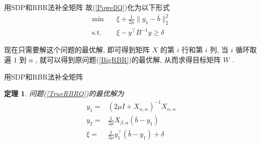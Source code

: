 \documentclass[slidestop, compress, mathserif, UTF8]{beamer}
\newtheorem{theo}{\bf \textcolor[rgb]{0.8,0,0}{定理}}[section]          %
\numberwithin{equation}{section}                                        %
\begin{document}
            \begin{frame}[t]{用SDP和RBR法补全矩阵}
                故(\ref{PowellQ})化为以下形式
				\begin{equation}
					\begin{split}\label{TrueRBRQ}
						\min \quad
							& \xi + \frac{1}{2\mu} \lVert{y_1 - \bar{b}}\rVert^2_2\\
						\text{s.t.} \quad
							& \xi - y^\top B^{-1} y \geq \delta
					\end{split}
				\end{equation}

                现在只需要解这个问题的最优解, 即可得到矩阵 $X$ 的第 $i$ 行和第 $i$ 列, 当 $i$ 循环取遍 $1$ 到 $n$ , 就可以得到原问题(\ref{BigRBR})的最优解, 从而求得目标矩阵 $W$ .
            \end{frame}
            \begin{frame}[t]{用SDP和RBR法补全矩阵}
                \begin{theo}
                    问题(\ref{TrueRBRQ})的最优解为
                    \begin{equation}
                        \begin{split}\label{TrueRBRA}
                            y_1 = & (2 \mu I + X_{\alpha, \alpha})^{-1} X_{\alpha, \alpha}\\
                            y_2 = & \frac{1}{2 \mu} X_{\beta, \alpha} (\bar{b} - y_1)\\
                            \xi = & \frac{1}{2 \mu} y_1^\top (\bar{b} - y_1) + \delta
                        \end{split}
                    \end{equation}
                \end{theo}
            \end{frame}
\end{document}

